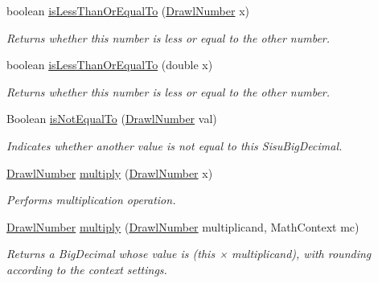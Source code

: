 \begin{DoxyCompactItemize}
boolean \hyperlink{classcom_1_1aarrelaakso_1_1drawl_1_1_drawl_number_ae4277949fd34fbe5dc721fc27d0960c2}{is\+Less\+Than\+Or\+Equal\+To} (\hyperlink{classcom_1_1aarrelaakso_1_1drawl_1_1_drawl_number}{Drawl\+Number} x)
\begin{DoxyCompactList}\small\item\em Returns whether this number is less or equal to the other number. \end{DoxyCompactList}\item 
boolean \hyperlink{classcom_1_1aarrelaakso_1_1drawl_1_1_drawl_number_a1e3afd1ca075c1381ee90261a2e31694}{is\+Less\+Than\+Or\+Equal\+To} (double x)
\begin{DoxyCompactList}\small\item\em Returns whether this number is less or equal to the other number. \end{DoxyCompactList}\item 
Boolean \hyperlink{classcom_1_1aarrelaakso_1_1drawl_1_1_drawl_number_aab6723b4f59ce1f72f50b6104a598c13}{is\+Not\+Equal\+To} (\hyperlink{classcom_1_1aarrelaakso_1_1drawl_1_1_drawl_number}{Drawl\+Number} val)
\begin{DoxyCompactList}\small\item\em Indicates whether another value is not equal to this Sisu\+Big\+Decimal. \end{DoxyCompactList}\item 
\hyperlink{classcom_1_1aarrelaakso_1_1drawl_1_1_drawl_number}{Drawl\+Number} \hyperlink{classcom_1_1aarrelaakso_1_1drawl_1_1_drawl_number_a8793a92d7875d105bc793f201f8b08d6}{multiply} (\hyperlink{classcom_1_1aarrelaakso_1_1drawl_1_1_drawl_number}{Drawl\+Number} x)
\begin{DoxyCompactList}\small\item\em Performs multiplication operation. \end{DoxyCompactList}\item 
\hyperlink{classcom_1_1aarrelaakso_1_1drawl_1_1_drawl_number}{Drawl\+Number} \hyperlink{classcom_1_1aarrelaakso_1_1drawl_1_1_drawl_number_a731f4a2206cbf0a029af6955f9121a9f}{multiply} (\hyperlink{classcom_1_1aarrelaakso_1_1drawl_1_1_drawl_number}{Drawl\+Number} multiplicand, Math\+Context mc)
\begin{DoxyCompactList}\small\item\em Returns a Big\+Decimal whose value is (this × multiplicand), with rounding according to the context settings. \end{DoxyCompactList}\item 

\end{DoxyCompactItemize}
